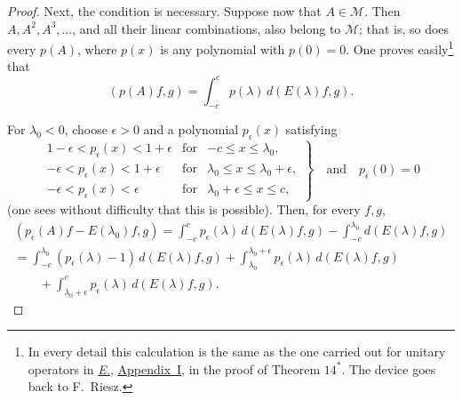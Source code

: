 \documentclass[
  paper=b5,
  twoside=true,
  fontsize=13pt,
  headings=normal,
  bookmarkpackage=false
]{scrartcl}
\theoremstyle{definition}
\newcommand{\Eref}{\hyperref[fn:E-paper]{\emph{E.}}}
\newcommand{\ErefText}[1]{\href{https://doi.org/10.1007/BF01782338}{#1}}
\begin{document}
\begin{proof}
Next, the condition is necessary.  Suppose now that
\(A\in\mathcal M\).  Then \(A,A^2,A^3,\ldots\), and all their linear
combinations, also belong to \(\mathcal M\); that is, so does every
\(p(A)\), where \(p(x)\) is any polynomial with \(p(0)=0\).  One proves
easily\footnote{\label{fn:44}In every detail this calculation is the same
as the one carried out for unitary operators in \Eref, \ErefText{Appendix~I}, in
the proof of Theorem \(14^*\). The device goes back to F.~Riesz.} that
\[
  (p(A)f,g)
  =\int_{-c}^{c}p(\lambda)\,d(E(\lambda)f,g).
\]

For \(\lambda_0<0\), choose \(\epsilon>0\) and a polynomial
\(p_\epsilon(x)\) satisfying
\[
  \left.
  \begin{array}{rll}
    1-\epsilon<p_\epsilon(x)<1+\epsilon
      &\text{for}&-c\leq x\leq\lambda_0,\\
    -\epsilon<p_\epsilon(x)<1+\epsilon
      &\text{for}&\lambda_0\leq x\leq\lambda_0+\epsilon,\\
    -\epsilon<p_\epsilon(x)<\epsilon
      &\text{for}&\lambda_0+\epsilon\leq x\leq c,
  \end{array}
  \right\}
  \quad\text{and}\quad p_\epsilon(0)=0
\]
(one sees without difficulty that this is possible). Then, for every
\(f,g\),
\begin{gather*}
  (p_\epsilon(A)f-E(\lambda_0)f,g)
  =\int_{-c}^{c}p_\epsilon(\lambda)\,d(E(\lambda)f,g)
    -\int_{-c}^{\lambda_0}d(E(\lambda)f,g)\\
  =\int_{-c}^{\lambda_0}(p_\epsilon(\lambda)-1)\,d(E(\lambda)f,g)
    +\int_{\lambda_0}^{\lambda_0+\epsilon}p_\epsilon(\lambda)\,d(E(\lambda)f,g)\\
  \qquad{}+\int_{\lambda_0+\epsilon}^{c}p_\epsilon(\lambda)\,d(E(\lambda)f,g).
\end{gather*}


\end{proof}
\end{document}
